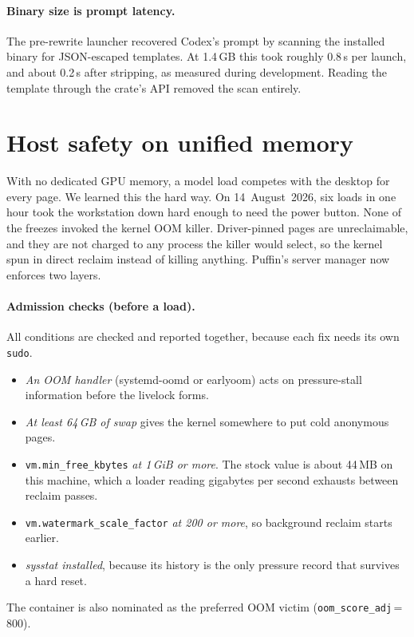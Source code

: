 \documentclass[11pt]{article}
\newcommand{\code}[1]{\texttt{#1}}
\begin{document}
\paragraph{Binary size is prompt latency.} The pre-rewrite launcher recovered Codex's prompt by
scanning the installed binary for JSON-escaped templates. At 1.4\,GB this took roughly 0.8\,s
per launch, and about 0.2\,s after stripping, as measured during development. Reading the template through the crate's API removed the scan
entirely.

\section{Host safety on unified memory}
\label{sec:safety}

With no dedicated GPU memory, a model load competes with the desktop for every page. We learned
this the hard way. On 14~August~2026, six loads in one hour took the workstation down hard enough to
need the power button. None of the freezes invoked the kernel OOM killer. Driver-pinned pages are
unreclaimable, and they are not charged to any process the killer would select, so the kernel spun
in direct reclaim instead of killing anything. Puffin's server manager now enforces two layers.

\paragraph{Admission checks (before a load).} All conditions are checked and reported together,
because each fix needs its own \code{sudo}.
\begin{itemize}
  \item \emph{An OOM handler} (systemd-oomd or earlyoom) acts on pressure-stall information
    \cite{linuxpsi} before the livelock forms.
  \item \emph{At least 64\,GB of swap} gives the kernel somewhere to put cold anonymous pages.
  \item \code{vm.min\_free\_kbytes} \emph{at 1\,GiB or more}. The stock value is about 44\,MB on
    this machine, which a loader reading gigabytes per second exhausts between reclaim passes.
  \item \code{vm.watermark\_scale\_factor} \emph{at 200 or more}, so background reclaim starts
    earlier.
  \item \emph{sysstat installed}, because its history is the only pressure record that survives a
    hard reset.
\end{itemize}
The container is also nominated as the preferred OOM victim (\code{oom\_score\_adj}\,=\,800).
\end{document}

